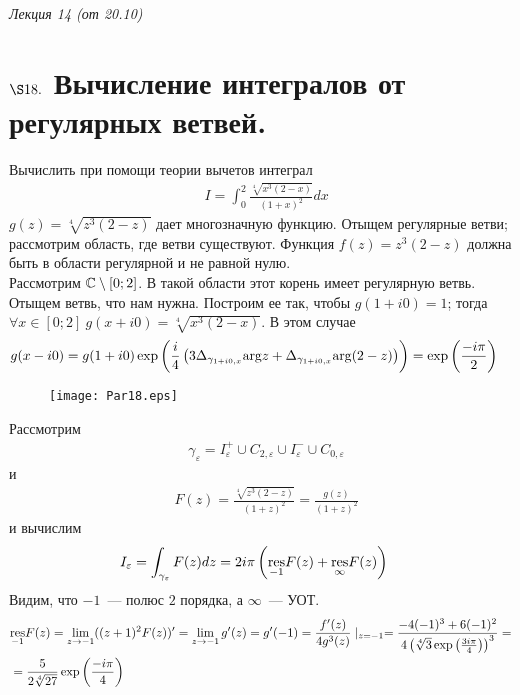 \begin{flushright}
    \textit{Лекция 14 (от 20.10)}
\end{flushright}
\section{$\S 18.$ Вычисление интегралов от регулярных ветвей.}
\Example
Вычислить при помощи теории вычетов интеграл
\begin{align*}
  & I = \int_0^2 \frac{\sqrt[4]{x^3(2-x)}}{(1+x)^2} dx
\end{align*}
\nonum
$g(z) = \sqrt[4]{z^3(2-z)}$ дает многозначную функцию. Отыщем регулярные ветви;
рассмотрим область, где ветви существуют. Функция $f(z) = z^3(2-z)$ должна быть
в области регулярной и не равной нулю.
\\
Рассмотрим $\mathbb{C} \setminus [0;2]$. В такой области этот корень имеет регулярную
ветвь.
\\
Отыщем ветвь, что нам нужна. Построим ее так, чтобы $g(1+i0) = 1$; тогда
$\forall x \in [0;2] \ g(x+i0) = \sqrt[4]{x^3(2-x)}$. В этом случае
\begin{align*}
  & g(x-i0) = g(1+i0)\exp\left( \frac{i}{4}\left( 3\Delta_{\gamma_{1+i0,x}}\mathrm{arg} z + \Delta_{\gamma_{1+i0,x}}\mathrm{arg} (2-z) \right) \right) = \exp\left( \frac{-i\pi}{2}\right)
\end{align*}
\begin{figure}[h!]
		\centering
		\texttt{[image: Par18.eps]}
		\label{fig:18.1}
\end{figure}
Рассмотрим
\begin{align*}
  & \gamma_\varepsilon = I_\varepsilon^+\cup C_{2, \varepsilon} \cup I_\varepsilon^-\cup C_{0, \varepsilon}
\end{align*}
и
\begin{align*}
  & F(z) = \frac{\sqrt[4]{z^3(2-z)}}{(1+z)^2} = \frac{g(z)}{(1+z)^2}
\end{align*}
и вычислим
\begin{align*}
  & I_\varepsilon = \int_{\gamma_\varepsilon}F(z) dz = 2 i \pi \left( \underset{-1}{\mathrm{res}} F(z) + \underset{\infty}{\mathrm{res}} F(z) \right)
\end{align*}
Видим, что $-1$~--- полюс $2$ порядка, а $\infty$~--- УОТ.
\begin{align*}
  & \underset{-1}{\mathrm{res}} F(z) = \lim_{z \to -1}((z+1)^2F(z))' = \lim_{z \to -1}g'(z) = g'(-1) = \frac{f'(z)}{4g^3(z)}\mid_{z = -1} = \frac{-4(-1)^3+6(-1)^2}{4\left( \sqrt[4]{3}\exp\left( \frac{3i\pi}{4} \right)\right)^3} = \\
  & = \frac{5}{2\sqrt[4]{27}}\exp\left( \frac{-i\pi}{4} \right)
\end{align*}
